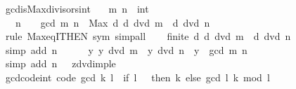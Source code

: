\begin{isabellebody}
\isamarkupfalse%
%
\endisatagproof
{\isafoldproof}%
%
\isadelimproof
\isanewline
%
\endisadelimproof
\isanewline
{}\isamarkupfalse%
\ gcd{\isacharunderscore}{\kern0pt}is{\isacharunderscore}{\kern0pt}Max{\isacharunderscore}{\kern0pt}divisors{\isacharunderscore}{\kern0pt}int{\isacharcolon}{\kern0pt}\isanewline
\ \ \ m\ n\ {\isacharcolon}{\kern0pt}{\isacharcolon}{\kern0pt}\ int\isanewline
\ \ \ {\isachardoublequoteopen}n\ {\isasymnoteq}\ {}{\isachardoublequoteclose}\ \ {\isachardoublequoteopen}gcd\ m\ n\ {\isacharequal}{\kern0pt}\ Max\ {\isacharbraceleft}{\kern0pt}d{\isachardot}{\kern0pt}\ d\ dvd\ m\ {\isasymand}\ d\ dvd\ n{\isacharbraceright}{\kern0pt}{\isachardoublequoteclose}\isanewline
%
\isadelimproof
%
\endisadelimproof
%
\isatagproof
{}\isamarkupfalse%
\ {\isacharparenleft}{\kern0pt}rule\ Max{\isacharunderscore}{\kern0pt}eqI{\isacharbrackleft}{\kern0pt}THEN\ sym{\isacharbrackright}{\kern0pt}{\isacharcomma}{\kern0pt}\ simp{\isacharunderscore}{\kern0pt}all{\isacharparenright}{\kern0pt}\isanewline
\ \ \isamarkupfalse%
\ {\isachardoublequoteopen}finite\ {\isacharbraceleft}{\kern0pt}d{\isachardot}{\kern0pt}\ d\ dvd\ m\ {\isasymand}\ d\ dvd\ n{\isacharbraceright}{\kern0pt}{\isachardoublequoteclose}\isanewline
\ \ \ \ \isamarkupfalse%
\ {\isacharparenleft}{\kern0pt}simp\ add{\isacharcolon}{\kern0pt}\ {\isacartoucheopen}n\ {\isasymnoteq}\ {}{\isacartoucheclose}{\isacharparenright}{\kern0pt}\isanewline
\ \ \isamarkupfalse%
\ {\isachardoublequoteopen}{\isasymAnd}y{\isachardot}{\kern0pt}\ y\ dvd\ m\ {\isasymand}\ y\ dvd\ n\ {\isasymLongrightarrow}\ y\ {\isasymle}\ gcd\ m\ n{\isachardoublequoteclose}\isanewline
\ \ \ \ \isamarkupfalse%
\ {\isacharparenleft}{\kern0pt}simp\ add{\isacharcolon}{\kern0pt}\ {\isacartoucheopen}n\ {\isasymnoteq}\ {}{\isacartoucheclose}\ zdvd{\isacharunderscore}{\kern0pt}imp{\isacharunderscore}{\kern0pt}le{\isacharparenright}{\kern0pt}\isanewline
{}\isamarkupfalse%
%
\endisatagproof
{\isafoldproof}%
%
\isadelimproof
\isanewline
%
\endisadelimproof
\isanewline
{}\isamarkupfalse%
\ gcd{\isacharunderscore}{\kern0pt}code{\isacharunderscore}{\kern0pt}int\ {\isacharbrackleft}{\kern0pt}code{\isacharbrackright}{\kern0pt}{\isacharcolon}{\kern0pt}\ {\isachardoublequoteopen}gcd\ k\ l\ {\isacharequal}{\kern0pt}\ {\isasymbar}if\ l\ {\isacharequal}{\kern0pt}\ {}\ then\ k\ else\ gcd\ l\ {\isacharparenleft}{\kern0pt}{\isasymbar}k{\isasymbar}\ mod\ {\isasymbar}l{\isasymbar}{\isacharparenright}{\kern0pt}{\isasymbar}{\isachardoublequoteclose}\isanewline

\end{isabellebody}
